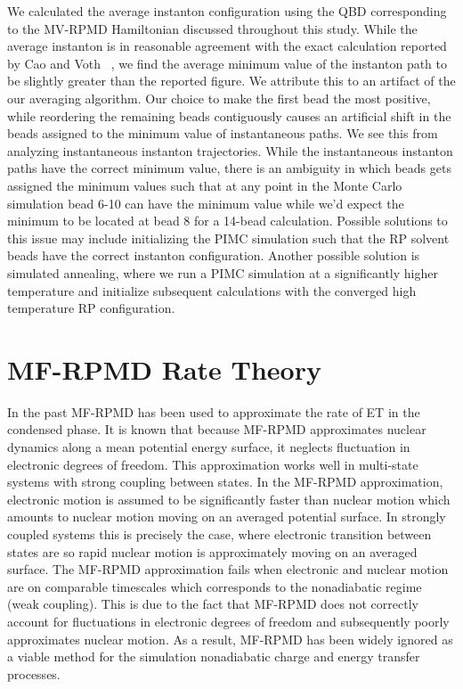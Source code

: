 \documentclass[phd,tocprelim]{cornell}
\begin{document}
We calculated the average instanton configuration using the QBD corresponding to the MV-RPMD Hamiltonian discussed throughout this study. While the average instanton is in reasonable agreement with the exact calculation reported by Cao and Voth ~\cite{CAO1995}, we find the average minimum value of the instanton path to be slightly greater than the reported figure. We attribute this to an artifact of the our averaging algorithm. Our choice to make the first bead the most positive, while reordering the remaining beads contiguously causes an artificial shift in the beads assigned to the minimum value of instantaneous paths. We see this from analyzing instantaneous instanton trajectories. While the instantaneous instanton paths have the correct minimum value, there is an ambiguity in which beads gets assigned the minimum values such that at any point in the Monte Carlo simulation bead 6-10 can have the minimum value while we'd expect the minimum to be located at bead 8 for a 14-bead calculation. Possible solutions to this issue may include initializing the PIMC simulation such that the RP solvent beads have the correct instanton configuration. Another possible solution is simulated annealing, where we run a PIMC simulation at a significantly higher temperature and initialize subsequent calculations with the converged high temperature RP configuration.

\section{MF-RPMD Rate Theory}
In the past MF-RPMD has been used to approximate the rate of ET in the condensed phase. It is known that because MF-RPMD approximates nuclear dynamics along a mean potential energy surface, it neglects fluctuation in electronic degrees of freedom. This approximation works well in multi-state systems with strong coupling between states. In the MF-RPMD approximation, electronic motion is assumed to be significantly faster than nuclear motion which amounts to nuclear motion moving on an averaged potential surface. In strongly coupled systems this is precisely the case, where electronic transition between states are so rapid nuclear motion is approximately moving on an averaged surface. The MF-RPMD approximation fails when electronic and nuclear motion are on comparable timescales which corresponds to the nonadiabatic regime (weak coupling). This is due to the fact that MF-RPMD does not correctly account for fluctuations in electronic degrees of freedom and subsequently poorly approximates nuclear motion. As a result, MF-RPMD has been widely ignored as a viable method for the simulation nonadiabatic charge and energy transfer processes. 
\end{document}
